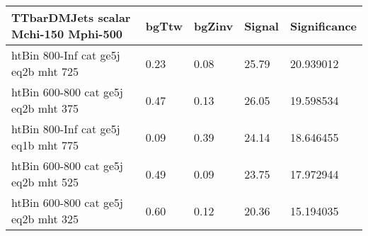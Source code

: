  \begin{tabular}{|l|l|l|l|l|}
\small
\label{mostSensitiveBins_TTbarDMJets_scalar_Mchi-150_Mphi-500_25ns}
	\textbf{TTbarDMJets scalar Mchi-150 Mphi-500}	 & 	bgTtw	 & 	bgZinv	 & 	Signal &	 Significance \\ 
	\hline
	htBin 800-Inf cat ge5j eq2b mht 725 & 	0.23	 & 	0.08	 & 	25.79 	&20.939012 \\ 
	htBin 600-800 cat ge5j eq2b mht 375 & 	0.47	 & 	0.13	 & 	26.05 	&19.598534 \\ 
	htBin 800-Inf cat ge5j eq1b mht 775 & 	0.09	 & 	0.39	 & 	24.14 	&18.646455 \\ 
	htBin 600-800 cat ge5j eq2b mht 525 & 	0.49	 & 	0.09	 & 	23.75 	&17.972944 \\ 
	htBin 600-800 cat ge5j eq2b mht 325 & 	0.60	 & 	0.12	 & 	20.36 	&15.194035 \\ 
\end{tabular}
